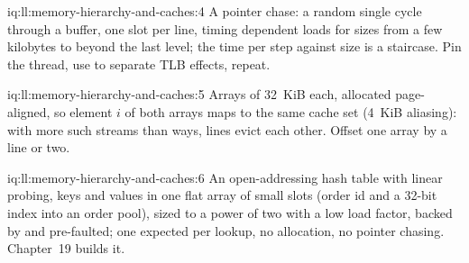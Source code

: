 \begin{solution}{iq:ll:memory-hierarchy-and-caches:4}
A pointer chase: a random single cycle through a buffer, one slot per line, timing dependent loads for sizes from a few
kilobytes to beyond the last level; the time per step against size is a staircase. Pin the thread, use  to
separate TLB effects, repeat.
\end{solution}

\begin{solution}{iq:ll:memory-hierarchy-and-caches:5}
Arrays of 32~KiB each, allocated page-aligned, so element $i$ of both arrays maps to the same cache set (4~KiB
aliasing): with more such streams than ways, lines evict each other. Offset one array by a line or two.
\end{solution}

\begin{solution}{iq:ll:memory-hierarchy-and-caches:6}
An open-addressing hash table with linear probing, keys and values in one flat array of small slots (order id and a
32-bit index into an order pool), sized to a power of two with a low load factor, backed by  and
pre-faulted; one expected  per lookup, no allocation, no pointer chasing. Chapter~19 builds it.
\end{solution}
